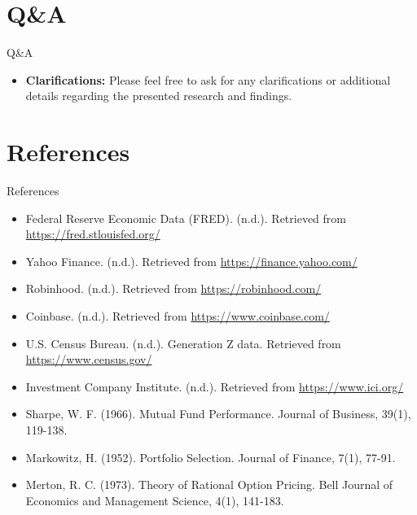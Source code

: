 \documentclass{beamer}
\begin{document}
\section{Q\&A}
\begin{frame}{Q\&A}
    \begin{itemize}
        \item \textbf{Clarifications:} Please feel free to ask for any clarifications or additional details regarding the presented research and findings.
    \end{itemize}
\end{frame}

\section{References}
\begin{frame}{References}
    \begin{itemize}
        \item Federal Reserve Economic Data (FRED). (n.d.). Retrieved from \url{https://fred.stlouisfed.org/}
        \item Yahoo Finance. (n.d.). Retrieved from \url{https://finance.yahoo.com/}
        \item Robinhood. (n.d.). Retrieved from \url{https://robinhood.com/}
        \item Coinbase. (n.d.). Retrieved from \url{https://www.coinbase.com/}
        \item U.S. Census Bureau. (n.d.). Generation Z data. Retrieved from \url{https://www.census.gov/}
        \item Investment Company Institute. (n.d.). Retrieved from \url{https://www.ici.org/}
        \item Sharpe, W. F. (1966). Mutual Fund Performance. Journal of Business, 39(1), 119-138.
        \item Markowitz, H. (1952). Portfolio Selection. Journal of Finance, 7(1), 77-91.
        \item Merton, R. C. (1973). Theory of Rational Option Pricing. Bell Journal of Economics and Management Science, 4(1), 141-183.
    \end{itemize}
\end{frame}
\end{document}
